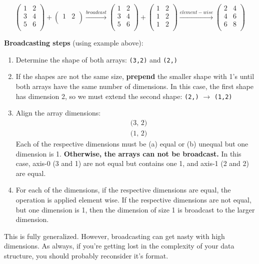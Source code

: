 \documentclass[12pt]{article}
\numberwithin{equation}{section}
\begin{document}
\begin{equation*}
    \begin{pmatrix}
        1 & 2\\
        3 & 4\\
        5 & 6\\
    \end{pmatrix}
    +
    \begin{pmatrix}
        1 & 2\\
    \end{pmatrix}
    \xrightarrow{broadcast }
    \begin{pmatrix}
        1 & 2\\
        3 & 4\\
        5 & 6\\
    \end{pmatrix}
    +
    \begin{pmatrix}
        1 & 2\\
        1 & 2\\
        1 & 2\\
    \end{pmatrix}
    \xrightarrow{element-wise }
	\begin{pmatrix}
		2 & 4\\
		4 & 6\\
		6 & 8\\
	\end{pmatrix}
\end{equation*}

\textbf{Broadcasting steps} (using example above):
\begin{enumerate}
    \item Determine the shape of both arrays: \verb|(3,2)| and \verb|(2,)|
    \item If the shapes are not the same size, \textbf{prepend} the smaller shape with 1's until both arrays have the same number of dimensions. In this case, the first shape has dimension 2, so we must extend the second shape: \verb|(2,)| $\rightarrow$ \verb|(1,2)|
    \item Align the array dimensions:
    \begin{align*}
        &\text{(3, 2)}\\
        &\text{(1, 2)}
    \end{align*}
    Each of the respective dimensions must be (a) equal or (b) unequal but one dimension is 1. \textbf{Otherwise, the arrays can not be broadcast.} In this case, axis-0 (3 and 1) are not equal but contains one 1, and axis-1 (2 and 2) are equal.
    \item For each of the dimensions, if the respective dimensions are equal, the operation is applied element wise. If the respective dimensions are not equal, but one dimension is 1, then the dimension of size 1 is broadcast to the larger dimension.
\end{enumerate}

   This is fully generalized. However, broadcasting can get nasty with high dimensions. As always, if you're getting lost in the complexity of your data structure, you should probably reconsider it's format. 
\end{document}
